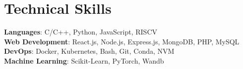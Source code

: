 \section{Technical Skills}
    \begin{itemize}[leftmargin=0.15in, label={}]
	\small{\item{
		\textbf{Languages}{: C/C++, Python, JavaScript, RISCV} \\
		\textbf{Web Development}{: React.js, Node.js, Express.js, MongoDB, PHP, MySQL} \\
		\textbf{DevOps}{: Docker, Kubernetes, Bash, Git, Conda, NVM} \\
		\textbf{Machine Learning}{: Scikit-Learn, PyTorch, Wandb} \\
	}}
    \end{itemize}

